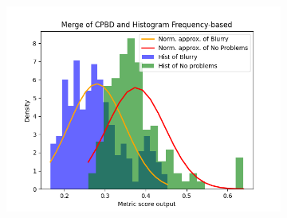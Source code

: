 \begin{figure}[H]
\begin{subfigure}[t]{0.48\textwidth}
        \caption{}
        \label{fig:CPBD_HF_thresh}
    \end{subfigure}\hspace{1em}
    \begin{subfigure}[t]{0.48\textwidth}
        \includegraphics[width=\textwidth]{Figures/results_on_thresholds/output_dens_cpbd_hf.png}
        \caption{}
        \label{fig:CPBD_HF_dens}
    \end{subfigure}\hspace{1em}
    \caption{}
    \label{fig:CPBD_HF_final}
\end{figure}

